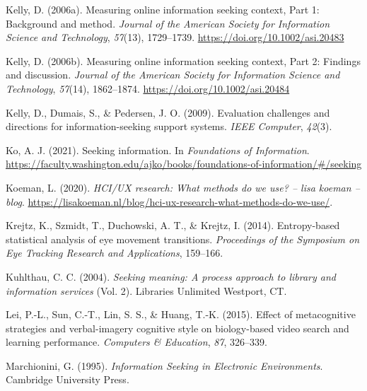 \documentclass[letterpaper, nobind]{templates/ociamthesis}
\newlength{\cslhangindent}
\newenvironment{CSLReferences}[2] %
 {%
  \setlength{\parindent}{0pt}
  \ifodd #1
  \let\oldpar\par
  \def\par{\hangindent=\cslhangindent\oldpar}
  \fi
  \setlength{\parskip}{1mm}
  \setlength{\baselineskip}{6mm}
 }%
 {}
\begin{document}
\begin{CSLReferences}{1}{0}
\leavevmode{}%
Kelly, D. (2006a). Measuring online information seeking context, {Part} 1: Background and method. \emph{Journal of the American Society for Information Science and Technology}, \emph{57}(13), 1729--1739. \url{https://doi.org/10.1002/asi.20483}

\leavevmode{}%
Kelly, D. (2006b). Measuring online information seeking context, {Part} 2: Findings and discussion. \emph{Journal of the American Society for Information Science and Technology}, \emph{57}(14), 1862--1874. \url{https://doi.org/10.1002/asi.20484}

\leavevmode{}%
Kelly, D., Dumais, S., \& Pedersen, J. O. (2009). Evaluation challenges and directions for information-seeking support systems. \emph{IEEE Computer}, \emph{42}(3).

\leavevmode{}%
Ko, A. J. (2021). Seeking information. In \emph{Foundations of {Information}}. \url{https://faculty.washington.edu/ajko/books/foundations-of-information/\#/seeking}

\leavevmode{}%
Koeman, L. (2020). \emph{HCI/UX research: What methods do we use? -- lisa koeman -- blog}. \url{https://lisakoeman.nl/blog/hci-ux-research-what-methods-do-we-use/}.

\leavevmode{}%
Krejtz, K., Szmidt, T., Duchowski, A. T., \& Krejtz, I. (2014). Entropy-based statistical analysis of eye movement transitions. \emph{Proceedings of the Symposium on Eye Tracking Research and Applications}, 159--166.

\leavevmode{}%
Kuhlthau, C. C. (2004). \emph{Seeking meaning: A process approach to library and information services} (Vol. 2). Libraries Unlimited Westport, CT.

\leavevmode{}%
Lei, P.-L., Sun, C.-T., Lin, S. S., \& Huang, T.-K. (2015). Effect of metacognitive strategies and verbal-imagery cognitive style on biology-based video search and learning performance. \emph{Computers \& Education}, \emph{87}, 326--339.

\leavevmode{}%
Marchionini, G. (1995). \emph{Information {Seeking} in {Electronic Environments}}. {Cambridge University Press}.


\end{CSLReferences}
\end{document}
